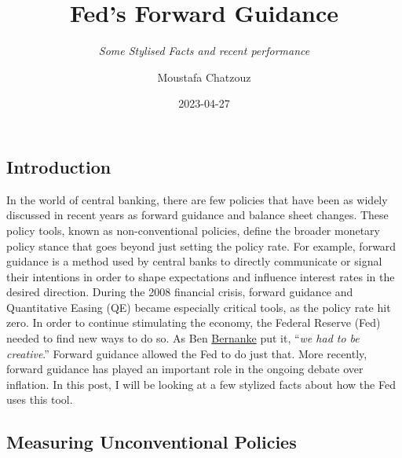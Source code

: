 \documentclass[
  letterpaper,
  DIV=11,
  numbers=noendperiod]{scrartcl}
\title{Fed's Forward Guidance}
\subtitle{\emph{Some Stylised Facts and recent performance}}
\author{Moustafa Chatzouz}
\date{2023-04-27}
\renewcommand*\contentsname{Table of contents}
\newcommand\contentsname{Table of contents}
\begin{document}
\maketitle
\ifdefined\Shaded\renewenvironment{Shaded}{\begin{tcolorbox}[boxrule=0pt, breakable, interior hidden, frame hidden, enhanced, borderline west={3pt}{0pt}{shadecolor}, sharp corners]}{\end{tcolorbox}}\fi

\renewcommand*\contentsname{Table of contents}
{
\hypersetup{linkcolor=}
\setcounter{tocdepth}{3}
\tableofcontents
}
\hypertarget{introduction}{%
\subsection{Introduction}\label{introduction}}

In the world of central banking, there are few policies that have been
as widely discussed in recent years as forward guidance and balance
sheet changes. These policy tools, known as non-conventional policies,
define the broader monetary policy stance that goes beyond just setting
the policy rate. For example, forward guidance is a method used by
central banks to directly communicate or signal their intentions in
order to shape expectations and influence interest rates in the desired
direction. During the 2008 financial crisis, forward guidance and
Quantitative Easing (QE) became especially critical tools, as the policy
rate hit zero. In order to continue stimulating the economy, the Federal
Reserve (Fed) needed to find new ways to do so. As Ben
\href{https://www.amazon.co.uk/21st-Century-Monetary-Policy-Inflation/dp/1324020466/ref=sr_1_1?adgrpid=1172080352962224\&hvadid=73255235197595\&hvbmt=be\&hvdev=c\&hvlocphy=4923\&hvnetw=o\&hvqmt=e\&hvtargid=kwd-73255197392577\%3Aloc-188\&hydadcr=18495_2211395\&keywords=21st+century+monetary+policy\&qid=1681764141\&sr=8-1}{Bernanke}
put it, ``\emph{we had to be creative}.'' Forward guidance allowed the
Fed to do just that. More recently, forward guidance has played an
important role in the ongoing debate over inflation. In this post, I
will be looking at a few stylized facts about how the Fed uses this
tool.

\hypertarget{measuring-unconventional-policies}{%
\subsection{Measuring Unconventional
Policies}\label{measuring-unconventional-policies}}
\end{document}
